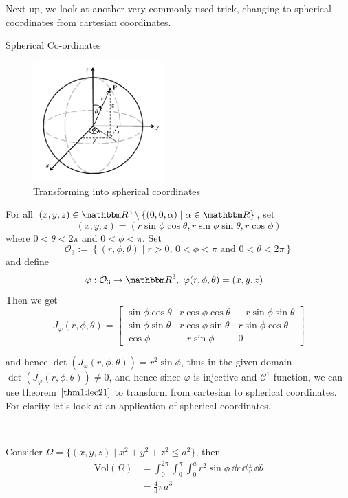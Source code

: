 \documentclass[../Analysis-3]{subfiles}
\begin{document}
Next up, we look at another very commonly used trick, changing to spherical coordinates from cartesian coordinates.

\begin{Eg}{Spherical Co-ordinates}{}
    \begin{figure}
        \centering
        \includegraphics[width=0.45\textwidth]{../figures/lec21.2.png}
        \caption{Transforming into spherical coordinates}
        \label{fig2:21}
    \end{figure}
    For all $(x,y,z) \in \R^3 \setminus \{ (0,0,\alpha) \mid \alpha \in \R \}$, set
    \[
        (x,y,z) = (r\sin\phi\cos\theta, r\sin\phi\sin\theta, r \cos\phi)
    \]
    where $0 < \theta < 2\pi$ and $0 < \phi < \pi$. Set
    \[
        \mathcal{O}_3 := \left\{ (r,\phi,\theta) \mid r >0, \, 0 < \phi < \pi \mbox{ and } 0 < \theta < 2\pi \right\}
    \]
    and define
    \begin{align*}
        \varphi : \mathcal{O}_3 & \to \R^3, \ \varphi(r,\phi,\theta) = (x,y,z)
    \end{align*}
    Then we get
    \[
        J_{\varphi}(r,\phi,\theta) = \begin{bmatrix}
            \sin\phi\cos\theta & r\cos\phi\cos\theta & -r\sin\phi\sin\theta \\
            \sin\phi\sin\theta & r\cos\phi\sin\theta & r\sin\phi\cos\theta  \\
            \cos\phi           & -r\sin\phi          & 0
        \end{bmatrix}
    \]


    and hence $\det(J_{\varphi}(r,\phi,\theta)) = r^2 \sin \phi$, thus in the given domain $\det(J_{\varphi}(r,\phi,\theta)) \neq 0$, and hence since $\varphi$ is injective and $\mathscr{C}^1$ function, we can use theorem $\ref{thm1:lec21}$ to transform from cartesian to spherical coordinates. For clarity let's look at an application of spherical coordinates.

    \

    Consider $\Omega = \{ (x,y,z) \mid x^2 + y^2 + z^2 \leq a^2 \}$, then
    \begin{align*}
        \mathrm{Vol}(\Omega) & = \int_0^{2\pi}\int_0^{\pi} \int_0^a r^2 \sin \phi \, \dd r \, \dd \phi \, \dd \theta \\
                             & = \frac{4}{3}\pi a^3
    \end{align*}
\end{Eg}
\end{document}
